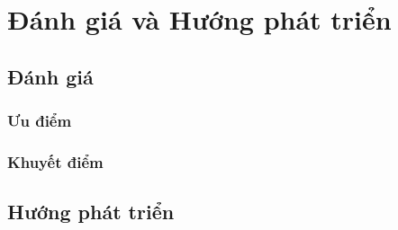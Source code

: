 \headerandfooterconfig

\chapter{Đánh giá và Hướng phát triển}
\section{Đánh giá}
\subsection{Ưu điểm}
\subsection{Khuyết điểm}
\section{Hướng phát triển}